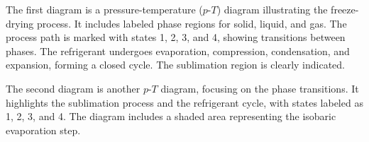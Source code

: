 The first diagram is a pressure-temperature (\(p\)-\(T\)) diagram illustrating the freeze-drying process. It includes labeled phase regions for solid, liquid, and gas. The process path is marked with states 1, 2, 3, and 4, showing transitions between phases. The refrigerant undergoes evaporation, compression, condensation, and expansion, forming a closed cycle. The sublimation region is clearly indicated.

The second diagram is another \(p\)-\(T\) diagram, focusing on the phase transitions. It highlights the sublimation process and the refrigerant cycle, with states labeled as 1, 2, 3, and 4. The diagram includes a shaded area representing the isobaric evaporation step.